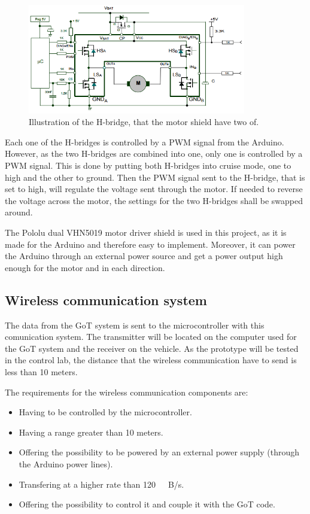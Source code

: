 \begin{figure}[H]
	\centering
	\includegraphics[width=0.85\textwidth]{figures/Hbridges.png}
		\caption{Illustration of the H-bridge, that the motor shield have two of.}
	\label{Hbridges}
\end{figure}
%
Each one of the H-bridges is controlled by a PWM signal from the Arduino. However, as the two H-bridges are combined into one, only one is controlled by a PWM signal. This is done by putting both H-bridges into cruise mode, one to high and the other to ground. Then the PWM signal sent to the H-bridge, that is set to high, will regulate the voltage sent through the motor. If needed to reverse the voltage across the motor, the settings for the two H-bridges shall be swapped around.

The Pololu dual VHN5019 motor driver shield is used in this project, as it is made for the Arduino and therefore easy to implement. Moreover, it can power the Arduino through an external power source and get a power output high enough for the motor and in each direction.



\subsection{Wireless communication system}
The data from the GoT system is sent to the microcontroller with this comunication system. The transmitter will be located on the computer used for the GoT system and the receiver on the vehicle. As the prototype will be tested in the control lab, the distance that the wireless communication have to send is less than 10 meters.

The requirements for the wireless communication components are:
\begin{itemize}
\item Having to be controlled by the microcontroller.
\item Having a range greater than 10 meters. 
\item Offering the possibility to be powered by an external power supply (through the Arduino power lines).
\item Transfering at a higher rate than \si{120\ B/s}. 
\item Offering the possibility to control it and couple it with the GoT code.
\end{itemize}

